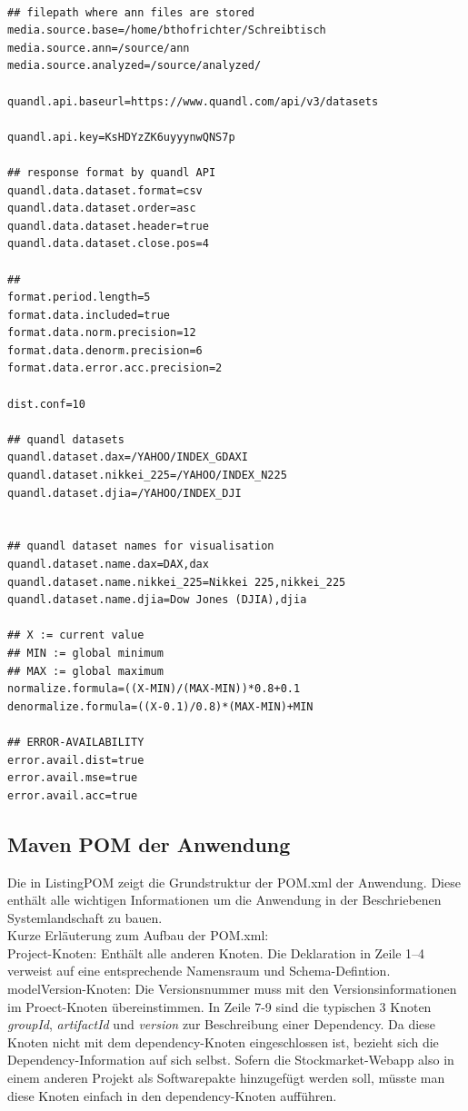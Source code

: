 \begin{lstlisting}[basicstyle=\scriptsize, caption=app.properties - Konfigurationsdatei der Stockmarket-Webapp]

## filepath where ann files are stored
media.source.base=/home/bthofrichter/Schreibtisch
media.source.ann=/source/ann
media.source.analyzed=/source/analyzed/

quandl.api.baseurl=https://www.quandl.com/api/v3/datasets

quandl.api.key=KsHDYzZK6uyyynwQNS7p

## response format by quandl API
quandl.data.dataset.format=csv
quandl.data.dataset.order=asc
quandl.data.dataset.header=true
quandl.data.dataset.close.pos=4

##
format.period.length=5
format.data.included=true
format.data.norm.precision=12
format.data.denorm.precision=6
format.data.error.acc.precision=2

dist.conf=10

## quandl datasets
quandl.dataset.dax=/YAHOO/INDEX_GDAXI
quandl.dataset.nikkei_225=/YAHOO/INDEX_N225
quandl.dataset.djia=/YAHOO/INDEX_DJI


## quandl dataset names for visualisation
quandl.dataset.name.dax=DAX,dax
quandl.dataset.name.nikkei_225=Nikkei 225,nikkei_225
quandl.dataset.name.djia=Dow Jones (DJIA),djia

## X := current value
## MIN := global minimum
## MAX := global maximum
normalize.formula=((X-MIN)/(MAX-MIN))*0.8+0.1
denormalize.formula=((X-0.1)/0.8)*(MAX-MIN)+MIN

## ERROR-AVAILABILITY
error.avail.dist=true
error.avail.mse=true
error.avail.acc=true
\end{lstlisting}

\subsection{Maven POM der Anwendung}

Die in ListingPOM zeigt die Grundstruktur der POM.xml der Anwendung. Diese enthält alle wichtigen Informationen um die Anwendung in der Beschriebenen Systemlandschaft zu bauen.\\
Kurze Erläuterung zum Aufbau der POM.xml: \\
Project-Knoten: Enthält alle anderen Knoten. Die Deklaration in 
Zeile 1--4 verweist auf eine entsprechende Namensraum und Schema-Defintion. 
modelVersion-Knoten: Die Versionsnummer muss mit den Versionsinformationen im Proect-Knoten übereinstimmen.
In Zeile 7-9 sind die typischen 3 Knoten \emph{groupId}, \emph{artifactId} und \emph{version} zur Beschreibung einer Dependency. Da diese Knoten nicht mit dem dependency-Knoten eingeschlossen ist, bezieht sich die Dependency-Information auf sich selbst. Sofern die Stockmarket-Webapp also in einem anderen Projekt als Softwarepakte hinzugefügt werden soll, müsste man diese Knoten einfach in den
dependency-Knoten aufführen.\\

